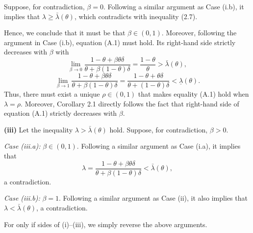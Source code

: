 \documentclass[12pt,a4paper]{article}
\newenvironment{original}{%
  \par\vspace{4pt}\noindent%
  \color{black}%
  \ignorespaces
}{%
  \par\vspace{2pt}%
}
\begin{document}
\begin{original}
Suppose, for contradiction, $\beta = 0$. Following a similar argument as Case (i.b), it implies that $\lambda \geq \bar{\lambda}(\theta)$, which contradicts with inequality (2.7).

Hence, we conclude that it must be that $\beta \in (0, 1)$. Moreover, following the argument in Case (i.b), equation (A.1) must hold. Its right-hand side strictly decreases with $\beta$ with
\[
\lim_{\beta \to 0} \frac{1 - \theta + \beta\theta\delta}{\theta + \beta(1-\theta)\delta} = \frac{1-\theta}{\theta} > \bar{\lambda}(\theta),
\]
\[
\lim_{\beta \to 1} \frac{1 - \theta + \beta\theta\delta}{\theta + \beta(1-\theta)\delta} = \frac{1 - \theta + \theta\delta}{\theta + (1-\theta)\delta} < \underline{\lambda}(\theta).
\]
Thus, there must exist a unique $\rho \in (0, 1)$ that makes equality (A.1) hold when $\lambda = \rho$. Moreover, Corollary 2.1 directly follows the fact that right-hand side of equation (A.1) strictly decreases with $\beta$.

\textbf{(iii)} Let the inequality $\lambda > \bar{\lambda}(\theta)$ hold. Suppose, for contradiction, $\beta > 0$.

\textit{Case (iii.a):} $\beta \in (0, 1)$. Following a similar argument as Case (i.a), it implies that
\[
\lambda = \frac{1 - \theta + \beta\theta\delta}{\theta + \beta(1-\theta)\delta} < \bar{\lambda}(\theta),
\]
a contradiction.

\textit{Case (iii.b):} $\beta = 1$. Following a similar argument as Case (ii), it also implies that $\lambda < \bar{\lambda}(\theta)$, a contradiction.

For only if sides of (i)--(iii), we simply reverse the above arguments.
\end{original}
\end{document}
